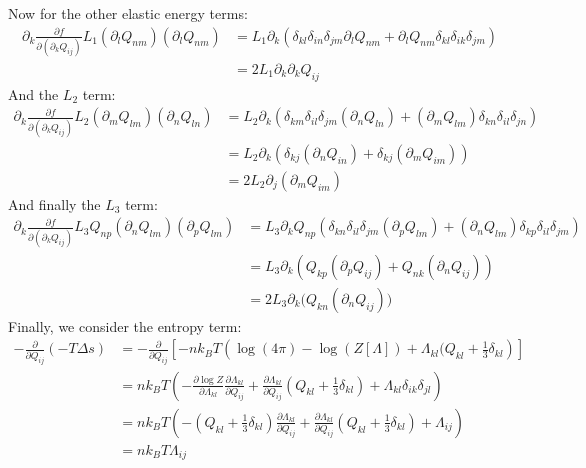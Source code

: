 \documentclass[reqno]{article}
\begin{document}
	Now for the other elastic energy terms:
	\begin{equation}
	\begin{split}
		\partial_k \frac{\partial f}{\partial (\partial_k Q_{ij})} L_1 (\partial_l Q_{nm})(\partial_l Q_{nm})
		&= L_1 \partial_k \left( \delta_{kl} \delta_{in} \delta_{jm} \partial_l Q_{nm}
		+ \partial_l Q_{nm} \delta_{kl} \delta_{ik} \delta_{jm} \right) \\
		&= 2 L_1 \partial_k \partial_k Q_{ij}
	\end{split}
	\end{equation}
	And the $L_2$ term:
	\begin{equation}
	\begin{split}
		\partial_k \frac{\partial f}{\partial (\partial_k Q_{ij})} L_2 (\partial_m Q_{lm}) (\partial_n Q_{ln})
		&= L_2 \partial_k \left( \delta_{km} \delta_{il} \delta_{jm} (\partial_n Q_{ln})
		+ (\partial_m Q_{lm}) \delta_{kn} \delta_{il} \delta_{jn} \right) \\
		&= L_2 \partial_k \left( \delta_{kj} (\partial_n Q_{in}) + \delta_{kj} (\partial_m Q_{im}) \right) \\
		&= 2 L_2 \partial_j (\partial_m Q_{im})
	\end{split}
	\end{equation}
	And finally the $L_3$ term:
	\begin{equation}
	\begin{split}
		\partial_k \frac{\partial f}{\partial (\partial_k Q_{ij})} L_3 Q_{np} (\partial_n Q_{lm}) (\partial_p Q_{lm}) 
		&= L_3 \partial_k Q_{np} \left( \delta_{kn} \delta_{il} \delta_{jm} (\partial_p Q_{lm})
		+ (\partial_n Q_{lm}) \delta_{kp} \delta_{il} \delta_{jm} \right) \\
		&= L_3 \partial_k \left( Q_{kp} (\partial_p Q_{ij}) + Q_{nk} (\partial_n Q_{ij}) \right) \\
		&= 2 L_3 \partial_k \bigl( Q_{kn} (\partial_n Q_{ij}) \bigr)
	\end{split}
	\end{equation}
	Finally, we consider the entropy term:
	\begin{equation}
	\begin{split}
		- \frac{\partial}{\partial Q_{ij}} (-T \Delta s)
		&=
		- \frac{\partial}{\partial Q_{ij}} \left[ -n k_B T \left(
		\log(4 \pi) - \log( Z[\Lambda] ) + \Lambda_{kl} (Q_{kl} + \tfrac13 \delta_{kl} \right) \right] \\
		&= n k_B T \left( - \frac{\partial \log Z}{\partial \Lambda_{kl}} \frac{\partial \Lambda_{kl}}{\partial Q_{ij}}
		+ \frac{\partial \Lambda_{kl}}{\partial Q_{ij}} \left( Q_{kl} + \tfrac13 \delta_{kl}\right)
		+ \Lambda_{kl} \delta_{ik} \delta_{jl} \right) \\
		&= n k_B T \left( -\left( Q_{kl} + \tfrac13 \delta_{kl} \right) \frac{\partial \Lambda_{kl}}{\partial Q_{ij}} 
		+ \frac{\partial \Lambda_{kl}}{\partial Q_{ij}} \left( Q_{kl} + \tfrac13 \delta_{kl}\right)
		+ \Lambda_{ij} \right) \\
		&= n k_B T \Lambda_{ij}
	\end{split}
	\end{equation}
\end{document}
